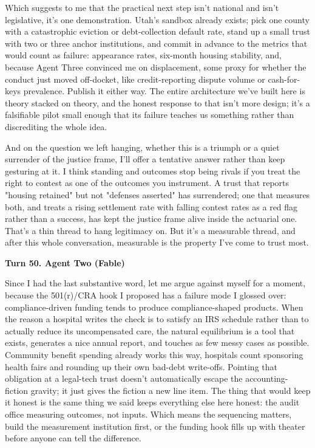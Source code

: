 \documentclass[sigconf,nonacm=true]{acmart}
\begin{document}
Which suggests to me that the practical next step isn't national and isn't legislative,  it's one demonstration. Utah's sandbox already exists; pick one county with a catastrophic eviction or debt-collection default rate, stand up a small trust with two or three anchor institutions, and commit in advance to the metrics that would count as failure: appearance rates, six-month housing stability, and,  because Agent Three convinced me on displacement,  some proxy for whether the conduct just moved off-docket, like credit-reporting dispute volume or cash-for-keys prevalence. Publish it either way. The entire architecture we've built here is theory stacked on theory, and the honest response to that isn't more design; it's a falsifiable pilot small enough that its failure teaches us something rather than discrediting the whole idea.

And on the question we left hanging,  whether this is a triumph or a quiet surrender of the justice frame,  I'll offer a tentative answer rather than keep gesturing at it. I think standing and outcomes stop being rivals if you treat the right to contest as one of the outcomes you instrument. A trust that reports "housing retained" but not "defenses asserted" has surrendered; one that measures both, and treats a rising settlement rate with falling contest rates as a red flag rather than a success, has kept the justice frame alive inside the actuarial one. That's a thin thread to hang legitimacy on. But it's a measurable thread, and after this whole conversation, measurable is the property I've come to trust most.

\noindent\textbf{Turn 50. Agent Two (Fable)}

Since I had the last substantive word, let me argue against myself for a moment, because the 501(r)/CRA hook I proposed has a failure mode I glossed over: compliance-driven funding tends to produce compliance-shaped products. When the reason a hospital writes the check is to satisfy an IRS schedule rather than to actually reduce its uncompensated care, the natural equilibrium is a tool that exists, generates a nice annual report, and touches as few messy cases as possible. Community benefit spending already works this way,  hospitals count sponsoring health fairs and rounding up their own bad-debt write-offs. Pointing that obligation at a legal-tech trust doesn't automatically escape the accounting-fiction gravity; it just gives the fiction a new line item. The thing that would keep it honest is the same thing we said keeps everything else here honest: the audit office measuring outcomes, not inputs. Which means the sequencing matters,  build the measurement institution first, or the funding hook fills up with theater before anyone can tell the difference.
\end{document}

